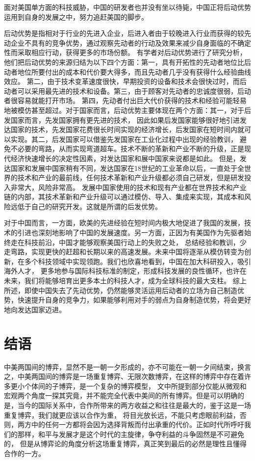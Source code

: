 \documentclass[UTF8]{article}
\begin{document}
    面对美国单方面的科技威胁，中国的研发者也并没有坐以待毙，中国正将后动优势运用到自身的发展之中，努力追赶美国的脚步。

    后动优势是指相对于行业的先进入企业，后进入者由于较晚进入行业而获得的较先动企业不具有的竞争优势，通过观察先动者的行动及效果来减少自身面临的不确定性而采取相应行动，获得更多的市场份额。
    有学者对后动优势进行了研究分析，他们把后动优势的来源归结为以下四个方面：第一，具有开拓性的先动者地位比后动者地位所要付出的成本和代价要大得多，而且先动者几乎没有获得什么经验曲线效应。
    第二，由于技术变革速度很快，早期投资的设备和技术会很快过时，而后动者可以采用最先进的技术和设备。第三，由于顾客对先动者的忠诚度很弱，后动者很容易就能打开市场。
    第四，先动者付出巨大代价获得的技术和经验可能轻易地被模仿甚至超过。对于国家而言，后动优势主要体现在两个方面：其一，对于后发国家而言，先发国家拥有更先进的技术，
    因此如果后发国家能够很好地引进发达国家的技术，先发国家花费很长时间实现的经济增长，后发国家在短时间内就可以实现。其二，后发国家可以借鉴先发国家在工业化过程中出现的经验教训，
    避免不必要的弯路，从而实现弯道超车。技术不断的革新和产业不断的升级，正是现代经济快速增长的决定性因素，对发达国家和展中国家来说都是如此。
    但是，发达国家和发展中国家稍有不同，发达国家在18世纪的工业革命以后，一直处于全世界的技术和产业的最前线，任何技术革新和产业升级都必须自己研发，但是研发投入非常大，风险非常高。
    发展中国家使用的技术和现有产业都在世界技术和产业链的内部，其技术革新和产业升级可以通过模仿、导入、集成来实现，其成本和风险远低于自己的研究开发。这就是所谓的后发优势。

    对于中国而言，一方面，欧美的先进经验在短时间内极大地促进了我国的发展，技术的引进也深刻地影响了中国的发展速度。另一方面，正因为有美国作为先驱者始终走在科技前沿，中国才能够观察美国行动上的失败之处，
    总结经验和教训，少走弯路，实现更快的赶超和长期以来的高速发展。未来中国将逐渐从模仿转变为创新，在多个科技领域中实现领跑。我们也欣喜地看到，中国在加大科研投入，吸引海外人才，
    更多地参与国际科技标准的制定，形成科技发展的良性循环，也许在未来，我们将能够培育出更多本土的科技人才，成为全球科技的最大支柱。
    综上所述，即使中国失去了先动优势，仍然能够灵活运用后动者的立场为自己制造优势，快速提升自身的竞争力，如果能够利用对手的弱点为自身制造优势，将会更好地向发达国家迈进。

    \section{结语}
    中美两国间的博弈，显然不是一朝一夕形成的，亦不可能在一朝一夕间结束，换言之，中美两国间的博弈是一场重复博弈、无限次数博弈，在这样的博弈中存在着许多更小个体间的子博弈，是一个复杂的博弈模型，
    文中所提到部分仅能从微观和宏观两个角度一探其究竟，并不能完全代表中美间的所有博弈。但是可以明确的是，当今的国际关系中，合作所带来的两方收益之和往往是最大的，鉴于这是一场重复博弈，我们就更应该以合作为重，
    将目光放长远，不能只考虑眼前利益，否则，两方中的任何一方都将会因为选择背叛而付出承重的代价。正如时代所呼吁我们的那样，和平与发展才是这个时代的主旋律，争夺利益的斗争固然是不可避免的，
    但是从博弈论的角度分析这场重复博弈，真正笑到最后的必然是理性且懂得合作的一方。
\end{document}
